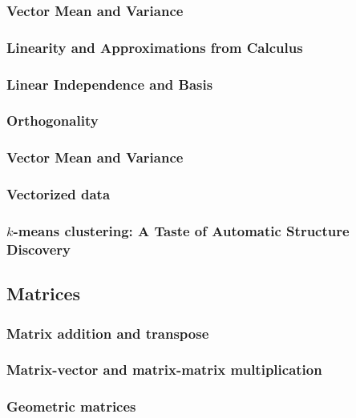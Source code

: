 \documentclass[10pt]{article}
\begin{document}
\subsubsection{Vector Mean and Variance}

\subsubsection{Linearity and Approximations from Calculus}

\subsubsection{Linear Independence and Basis}

\subsubsection{Orthogonality}

\subsubsection{Vector Mean and Variance}

\subsubsection{Vectorized data}

\subsubsection{$k$-means clustering: A Taste of Automatic Structure Discovery}

\subsection{Matrices}

\subsubsection{Matrix addition and transpose}

\subsubsection{Matrix-vector and matrix-matrix multiplication}

\subsubsection{Geometric matrices}
\end{document}
